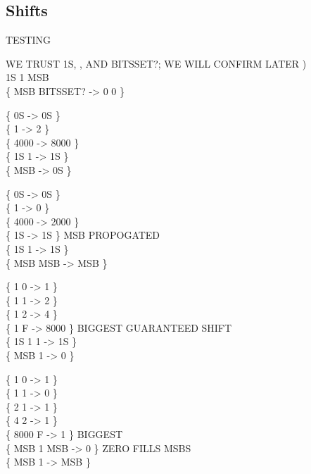 \subsection{Shifts}

\begin{tt}
TESTING    

 WE TRUST 1S, , AND BITSSET?; WE WILL CONFIRM  LATER ) \\
1S 1    MSB \\
\{ MSB BITSSET? -> 0 0 \}

\{ 0S	 -> 0S \} \\
\{ 1	 -> 2 \} \\
\{ 4000  -> 8000 \} \\
\{ 1S	 1  -> 1S \} \\
\{ MSB	 -> 0S \}

\{ 0S		 -> 0S \} \\
\{ 1		 -> 0 \} \\
\{ 4000		 -> 2000 \} \\
\{ 1S		 -> 1S \} \tab[4]  MSB PROPOGATED \\
\{ 1S 1   -> 1S \} \\
\{ MSB  MSB  -> MSB \}

\{   1 0  -> 1 \} \\
\{   1 1  -> 2 \} \\
\{   1 2  -> 4 \} \\
\{   1 F  -> 8000 \} \tab[4]  BIGGEST GUARANTEED SHIFT \\
\{  1S 1  1  -> 1S \} \\
\{ MSB 1  -> 0 \}

\{ 1 0  -> 1 \} \\
\{ 1 1  -> 0 \} \\
\{ 2 1  -> 1 \} \\
\{ 4 2  -> 1 \} \\
\{ 8000 F  -> 1 \}					\tab[6.6]  BIGGEST \\
\{ MSB 1  MSB  -> 0 \}	\tab[2.5]   ZERO FILLS MSBS \\
\{ MSB 1   -> MSB \}
\end{tt}

